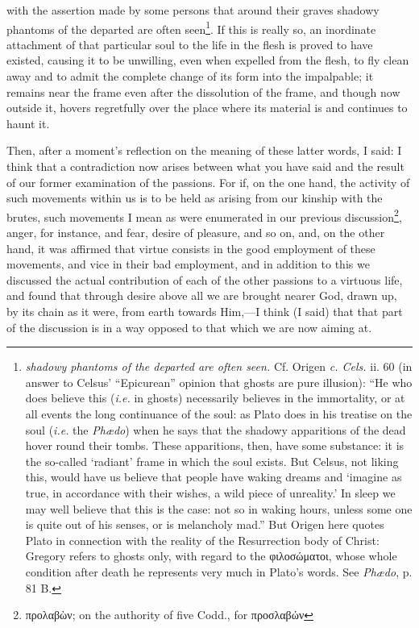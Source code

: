 with the assertion made by some persons that around their graves shadowy phantoms of the departed are often seen\footnote{\emph{shadowy phantoms of the departed are often seen.} Cf. Origen \emph{c. Cels.} ii. 60 (in answer to Celsus’ “Epicurean” opinion that ghosts are pure illusion): “He who does believe this (\emph{i.e.} in ghosts) necessarily believes in the immortality, or at all events the long continuance of the soul: as Plato does in his treatise on the soul (\emph{i.e.} the \emph{Phædo}) when he says that the shadowy apparitions of the dead hover round their tombs. These apparitions, then, have some substance: it is the so-called ‘radiant’ frame in which the soul exists. But Celsus, not liking this, would have us believe that people have waking dreams and ‘imagine as true, in accordance with their wishes, a wild piece of unreality.’ In sleep we may well believe that this is the case: not so in waking hours, unless some one is quite out of his senses, or is melancholy mad.” But Origen here quotes Plato in connection with the reality of the Resurrection body of Christ: Gregory refers to ghosts only, with regard to the \textgreek{φιλοσώματοι}, whose whole condition after death he represents very much in Plato’s words. See \emph{Phædo}, p. 81 B.}. If this is really so, an inordinate attachment of that particular soul to the life in the flesh is proved to have existed, causing it to be unwilling, even when expelled from the flesh, to fly clean away and to admit the complete change of its form into the impalpable; it remains near the frame even after the dissolution of the frame, and though now outside it, hovers regretfully over the place where its material is and continues to haunt it.

Then, after a moment’s reflection on the meaning of these latter words, I said: I think that a contradiction now arises between what you have said and the result of our former examination of the passions. For if, on the one hand, the activity of such movements within us is to be held as arising from our kinship with the brutes, such movements I mean as were enumerated in our previous discussion\footnote{\textgreek{προλαβὼν}; on the authority of five Codd., for \textgreek{προσλαβών}}, anger, for instance, and fear, desire of pleasure, and so on, and, on the other hand, it was affirmed that virtue consists in the good employment of these movements, and vice in their bad employment, and in addition to this we discussed the actual contribution of each of the other passions to a virtuous life, and found that through desire above all we are brought nearer God, drawn up, by its chain as it were, from earth towards Him,—I think (I said) that that part of the discussion is in a way opposed to that which we are now aiming at.

